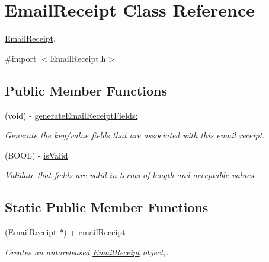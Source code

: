 \hypertarget{interface_email_receipt}{
\section{EmailReceipt Class Reference}
\label{interface_email_receipt}
}


\hyperlink{interface_email_receipt}{EmailReceipt}.  




{\ttfamily \#import $<$EmailReceipt.h$>$}

\subsection*{Public Member Functions}
\begin{DoxyCompactItemize}
\item 
(void) -\/ \hyperlink{interface_email_receipt_a0667f5d47432520a7a76e39c8ff80948}{generateEmailReceiptFields:}
\begin{DoxyCompactList}\small\item\em Generate the key/value fields that are associated with this email receipt. \item\end{DoxyCompactList}\item 
(BOOL) -\/ \hyperlink{interface_email_receipt_a643a132ff66cd612089b663778f25f18}{isValid}
\begin{DoxyCompactList}\small\item\em Validate that fields are valid in terms of length and acceptable values. \item\end{DoxyCompactList}\end{DoxyCompactItemize}
\subsection*{Static Public Member Functions}
\begin{DoxyCompactItemize}
\item 
(\hyperlink{interface_email_receipt}{EmailReceipt} $\ast$) + \hyperlink{interface_email_receipt_a62a4108502ab24d3222e362361369556}{emailReceipt}
\begin{DoxyCompactList}\small\item\em Creates an autoreleased \hyperlink{interface_email_receipt}{EmailReceipt} object;. \item\end{DoxyCompactList}\end{DoxyCompactItemize}
